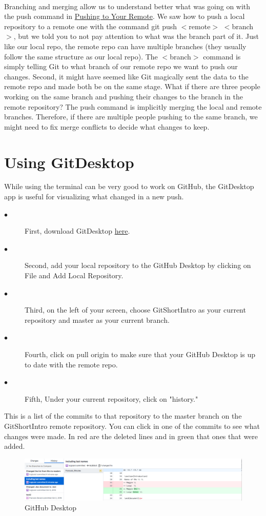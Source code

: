 \documentclass[12pt]{article}
\begin{document}
    \\
    Branching and merging allow us to understand better what was going on with the push command in \hyperref[sec:pushing]{Pushing to Your Remote}. We saw how to push a local repository to a remote one with the command git push $<$remote$>$ $<$branch$>$, but we told you to not pay attention to what was the branch part of it. Just like our local repo, the remote repo can have multiple branches (they usually follow the same structure as our local repo). The $<$branch$>$ command is simply telling Git to what branch of our remote repo we want to push our changes. Second, it might have seemed like Git magically sent the data to the remote repo and made both be on the same stage. What if there are three people working on the same branch and pushing their changes to the branch in the remote repository? The push command is implicitly merging the local and remote branches. Therefore, if there are multiple people pushing to the same branch, we might need to fix merge conflicts to decide what changes to keep.
    \section{Using GitDesktop}
    While using the terminal can be very good to work on GitHub, the GitDesktop app is useful for visualizing what changed in a new push. 
    \begin{description}
    \item[$\bullet$] First, download GitDesktop  \href{https://desktop.github.com/}{here}.
    \item[$\bullet$] Second, add your local repository to the GitHub Desktop by clicking on File and Add Local Repository.
    \item[$\bullet$] Third, on the left of your screen, choose GitShortIntro as your current repository and master as your current branch.
    \item[$\bullet$] Fourth, click on pull origin to make sure that your GitHub Desktop is up to date with the remote repo.
    \item[$\bullet$] Fifth, Under your current repository, click on "history."
    \end{description}
    This is a list of the commits to that repository to the master branch on the GitShortIntro remote repository. You can click in one of the commits to see what changes were made. In red are the deleted lines and in green that ones that were added. \\
    \begin{figure}[t]
	\caption{GitHub Desktop}
	\includegraphics[scale=0.5]{figure13}
    \end{figure} 
    
\end{document}
